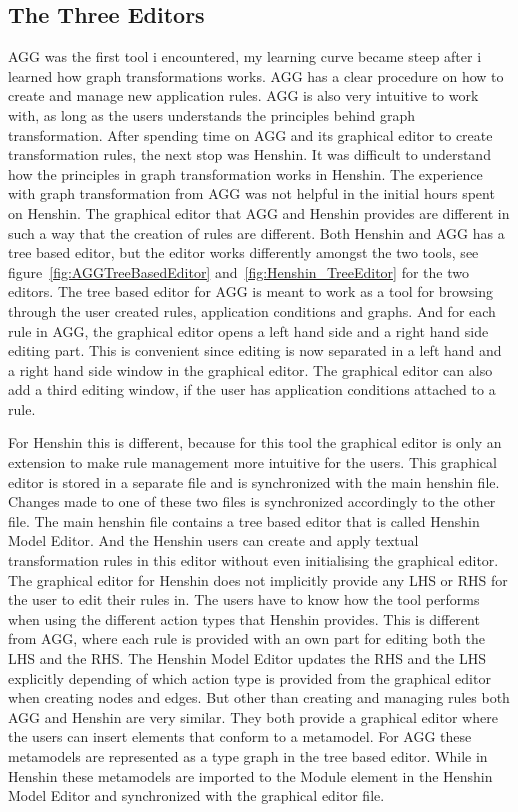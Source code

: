 \subsection{The Three Editors}
AGG was the first tool i encountered, my learning curve became steep after i
learned how graph transformations works. AGG has a clear procedure on how to create and
manage new application rules. AGG is also very intuitive to work with, as long
as the users understands the principles behind graph transformation.
After spending time on AGG and its graphical editor to create transformation rules, the next
stop was Henshin. It was difficult to understand how the principles in graph
transformation works in Henshin. The experience with graph transformation from
AGG was not helpful in the initial hours spent on Henshin. The graphical editor
that AGG and Henshin provides are different in such a way that the creation of
rules are different. Both Henshin and AGG has a tree based editor, but the
editor works differently amongst the two tools, see
figure~\ref{fig:AGGTreeBasedEditor} and~\ref{fig:Henshin_TreeEditor} for the
two editors. The tree based editor for AGG is meant to work as a tool for
browsing through the user created rules, application conditions and graphs. And
for each rule in AGG, the graphical editor opens a left hand side and a right
hand side editing part. This is convenient since editing is now separated in a
left hand and a right hand side window in the graphical editor. The graphical editor can also
add a third editing window, if the user has application conditions attached to a
rule. 

For Henshin this is different, because for this tool the graphical editor
is only an extension to make rule management more intuitive for the users. This
graphical editor is stored in a separate file and is synchronized with the main
henshin file. Changes made to one of these two files is synchronized
accordingly to the other file. The main henshin file contains a tree based
editor that is called Henshin Model Editor. And the Henshin users can create and
apply textual transformation rules in this editor without even initialising the
graphical editor. The graphical editor for Henshin does not implicitly provide
any LHS or RHS for the user to edit their rules in. The users have to know how the tool
performs when using the different action types that Henshin provides. This is
different from AGG, where each rule is provided with an own part for editing
both the LHS and the RHS. The Henshin Model Editor updates the RHS and the LHS
explicitly depending of which action type is provided from the graphical
editor when creating nodes and edges. But other than creating and managing
rules both AGG and Henshin are very similar. They both provide a graphical editor where
the users can insert elements that conform to a metamodel. For AGG these
metamodels are represented as a type graph in the tree based editor. While in
Henshin these metamodels are imported to the Module element in the Henshin Model
Editor and synchronized with the graphical editor file.

